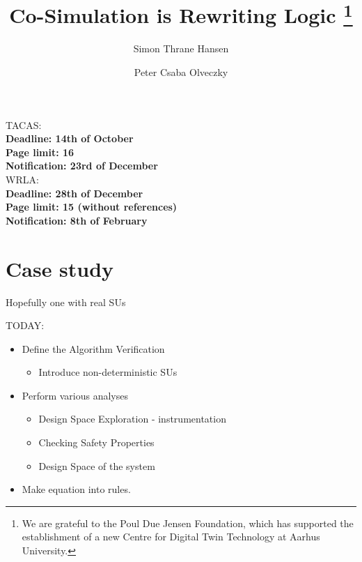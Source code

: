 \documentclass[runningheads]{llncs}
\begin{document}
\title{Co-Simulation is Rewriting Logic
\thanks{We are grateful to the Poul Due Jensen Foundation, which has supported the establishment of a new Centre for Digital Twin Technology at Aarhus University.}}

\author{Simon Thrane Hansen  
\and Peter Csaba Olveczky  }
%


%
\institute{
  DIGIT, Department of Electrical and Computer Engineering, Aarhus University, \\
  \and Department of Computer Science, Oslo University - \textbf{Check this} \\
}

\maketitle              %
TACAS:\\
\textbf{Deadline: 14th of October}
\\
\textbf{Page limit: 16}\\
\textbf{Notification: 23rd of December}
\\
WRLA:\\
\textbf{Deadline: 28th of December}
\\
\textbf{Page limit: 15 (without references)}\\
\textbf{Notification: 8th of February}





\section{Case study}
Hopefully one with real SUs


TODAY:
\begin{itemize}
  \item Define the Algorithm Verification
  \begin{itemize}
    \item Introduce non-deterministic SUs
  \end{itemize}
  \item Perform various analyses
  \begin{itemize}
    \item Design Space Exploration - instrumentation
    \item Checking Safety Properties
    \item Design Space of the system
  \end{itemize}
  \item Make equation into rules.
\end{itemize}
\end{document}
